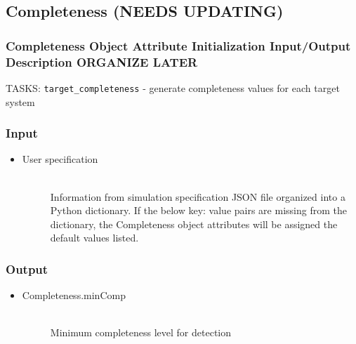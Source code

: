 \documentclass[cleanfoot]{asme2ej}
\begin{document}
\subsection{Completeness (NEEDS UPDATING)}
\label{sec:completeness}
\subsubsection{Completeness Object Attribute Initialization Input/Output Description ORGANIZE LATER}
TASKS: \verb+target_completeness+ - generate completeness values for each target system
\subsubsection*{Input}
\begin{itemize}
    \item 
    \begin{description}
        \item[User specification] \hfill \\
        Information from simulation specification JSON file organized into a Python dictionary. If the below key: value pairs are missing from the dictionary, the Completeness object attributes will be assigned the default values listed.
    \end{description}
\end{itemize}

\subsubsection*{Output}
\begin{itemize}
    \item 
    \begin{description}
        \item[Completeness.minComp] \hfill \\
        Minimum completeness level for detection
    \end{description}
\end{itemize}

\end{document}
